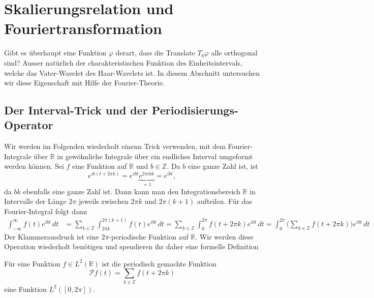 %
%
%
\section{Skalierungsrelation und Fouriertransformation
\label{section:skalfour}}


Gibt es überhaupt eine Funktion $\varphi$ derart, dass die Translate
$T_b\varphi$ alle orthogonal sind?
Ausser natürlich der charakteristischen Funktion des Einheitsintervals,
welche das Vater-Wavelet des Haar-Wavelets ist.
In diesem Abschnitt untersuchen wir diese Eigenschaft mit Hilfe der 
Fourier-Theorie.

%
%
\subsection{Der Interval-Trick und der Periodisierungs-Operator}
Wir werden im Folgenden wiederholt einenn Trick verwenden, mit dem
Fourier-Integrale über $\mathbb R$ in gewöhnliche Integrale
über ein endliches Interval umgeformt werden können.
Sei $f$ eine Funktion auf $\mathbb R$ und $b\in\mathbb Z$.
Da $b$ eine ganze Zahl ist, ist
\[
e^{ib(t+2\pi k)}
=
e^{ibt}\underbrace{e^{2\pi i bk}}_{\displaystyle = 1}
=
e^{ibt},
\]
da $bk$ ebenfalls eine ganze Zahl ist.
Dann kann man den Integrationsbereich $\mathbb R$ in Intervalle der
Länge $2\pi$ jeweils zwischen $2\pi k$ und $2\pi(k+1)$ aufteilen.
Für das Fourier-Integral folgt dann
\begin{align}
\int_{-\infty}^\infty f(t) e^{ibt}\,dt
&=
\sum_{k\in\mathbb Z} \int_{2\pi k}^{2\pi(k+1)} f(t) e^{ibt}\,dt
=
\sum_{k\in\mathbb Z} \int_{0}^{2\pi} f(t+2\pi k) e^{ibt}\,dt
=
\int_{0}^{2\pi} \biggl(\sum_{k\in\mathbb Z} f(t+2\pi k)\biggr) e^{ibt}\,dt
\label{msa:intervaltrick}
\end{align}
Der Klammerausdruck ist eine $2\pi$-periodische Funktion auf $\mathbb R$.
Wir werden diese Operation wiederholt benötigen und spendieren ihr daher
eine formelle Definition

\begin{definition}
Für eine Funktion $f\in L^2(\mathbb R)$ ist die periodisch gemachte Funktion
\[
\mathcal{P}f(t) = \sum_{k\in\mathbb Z} f(t+2\pi k)
\]
eine Funktion $L^2([0,2\pi])$.
\end{definition}

